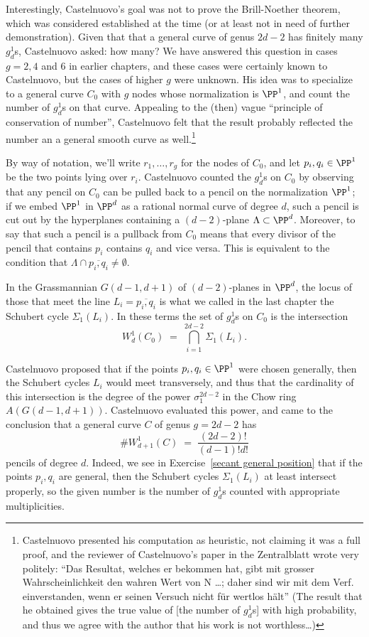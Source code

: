 Interestingly, Castelnuovo's goal was not to prove the Brill-Noether theorem, which was considered established at the time (or at least not in need of further demonstration). Given that
that a general curve of genus $2d-2$ has finitely many $g^{1}_{d}$s,
Castelnuovo asked: how many? We have answered this question in cases $g = 2, 4$ and 6 in earlier chapters, and these cases were certainly known to Castelnuovo, but the cases of higher $g$ were unknown.
 His idea was to specialize to a general curve $C_0$ with $g$ nodes  whose normalization is $\PP^1$, and count the number of $g^1_d$s on that curve. Appealing to the (then) vague ``principle of conservation of number'', Castelnuovo felt that the result probably reflected the number an a general smooth curve as well.\footnote{Castelnuovo presented his computation as heuristic, not claiming it was a full proof, and the reviewer of Castelnuovo's paper in the Zentralblatt wrote very politely:
``Das Resultat, welches er bekommen hat, gibt mit grosser Wahrscheinlichkeit den wahren Wert von N \dots; daher sind wir mit dem Verf. einverstanden, wenn er seinen Versuch nicht für wertlos hält''
(The result that he obtained gives the true value of [the number of $g^1_d$s] with high probability, and thus we agree with the author that his work is not worthless\dots)}  

By way of notation, we'll write $r_1,\dots,r_g$ for the nodes of $C_0$, and let $p_i, q_i \in \PP^1$ be the two points lying over $r_i$.
Castelnuovo counted the $g^1_d$s on $C_0$ by observing that any pencil on $C_0$ can be pulled back to a pencil on the normalization $\PP^1$; if we embed $\PP^1$ in $\PP^d$ as a rational normal curve of degree $d$, such a pencil is cut out by the hyperplanes containing
 a $(d-2)$-plane $\Lambda \subset \PP^d$. Moreover, to say that such a pencil is a pullback from $C_0$ means that every divisor of the pencil that contains $p_i$ contains $q_i$ and vice versa. This  is equivalent to the condition that $\Lambda \cap \overline{p_i,q_i} \neq \emptyset$.

In the Grassmannian $G(d-1, d+1)$ of $(d-2)$-planes in $\PP^d$, the locus of those that meet the line $L_i = \overline{p_i,q_i}$ is what we called in the last chapter the Schubert cycle $\Sigma_1(L_i)$. In these terms the set of $g^1_d$s on $C_0$ is the intersection
$$
W^1_d(C_0) \; = \; \bigcap_{i=1}^{2d-2} \Sigma_1(L_i).
$$

Castelnuovo proposed that if the points $p_i, q_i\in \PP^1$ were chosen generally, then the Schubert cycles
$L_i$ would meet transversely, and thus that the cardinality of this intersection is the degree of the power $\sigma_1^{2d-2}$ in the Chow ring $A(G(d-1, d+1))$. Castelnuovo evaluated this power, and came to the conclusion that a general curve $C$ of genus $g=2d-2$ has 
$$
\#W^1_{d+1}(C) \; = \; \frac{(2d-2)!}{(d-1)!d!}
$$
pencils of degree $d$. Indeed, we see
 in Exercise~\ref{secant general position} that if the points $p_i, q_i$ are general, then the Schubert cycles $\Sigma_1(L_i)$ at least intersect properly, so the given number is the number of $g^1_d$s counted with appropriate multiplicities.

